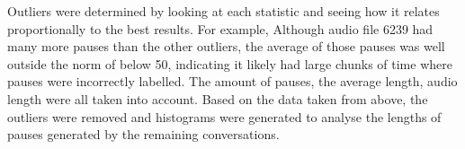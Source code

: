 Outliers were determined by looking at each statistic and seeing how it relates proportionally to the best results. For example, Although audio file 6239 had many more pauses than the other outliers, the average of those pauses was well outside the norm of below 50, indicating it likely had large chunks of time where pauses were incorrectly labelled. The amount of pauses, the average length, audio length were all taken into account. Based on the data taken from above, the outliers were removed and histograms were generated to analyse the lengths of pauses generated by the remaining conversations. \\


%
%

